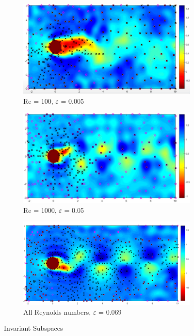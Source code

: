 \documentclass[letterpaper,12pt,peerreviewca,draftcls]{IEEEtran}
\begin{document}
\begin{figure}[h]
	\centering
	\begin{subfigure}[t]{0.5\textwidth}
		\includegraphics[width=\linewidth]{"Figure S10a"}
		\caption{Re = 100, $\varepsilon$ = 0.005}
	\end{subfigure}
	\begin{subfigure}[t]{0.5\textwidth}
		\includegraphics[width=\linewidth]{"Figure S10b"}
		\caption{Re = 1000, $\varepsilon$ = 0.05}
	\end{subfigure}
	\begin{subfigure}[t]{0.5\textwidth}
		\includegraphics[width=\linewidth]{"Figure S10c"}
		\caption{All Reynolds numbers, $\varepsilon$ = 0.069}
	\end{subfigure}
	\caption{Invariant Subspaces}
	\label{fig:subspaces}
\end{figure}
\end{document}
